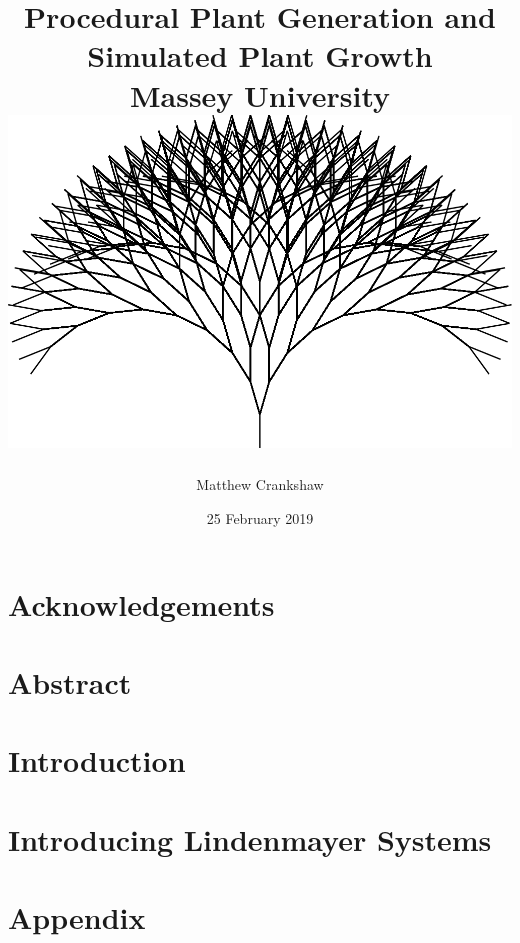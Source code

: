\documentclass[11pt]{report}
\title{
{ Procedural Plant Generation and Simulated Plant Growth }\\
{\large Massey University}
\\
{\includegraphics[scale=0.35]{titlepage.png}}
}
\author{Matthew Crankshaw}
\date{25 February 2019}
\begin{document}
\maketitle

\chapter*{Acknowledgements}

\chapter*{Abstract}

\tableofcontents
\listoffigures


\chapter{Introduction}


\chapter{Introducing Lindenmayer Systems}


\appendix
\chapter{Appendix}

\end{document}
